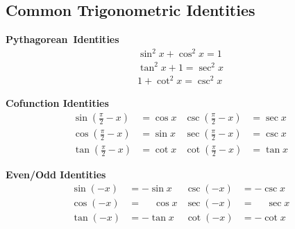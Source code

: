 \vfill

\subsection{Common Trigonometric Identities}

\noindent%
\begin{minipage}[t]{.25\linewidth}
	\textbf{Pythagorean~Identities}\vspace{-.5\baselineskip}
	\begin{gather*}
		\sin ^2x+\cos ^2x= 1 \\
		\tan^2x+ 1 = \sec^2 x \\
		1 + \cot^2x=\csc^2 x
	\end{gather*}
\end{minipage}%
\begin{minipage}[t]{.43\linewidth}
	\textbf{Cofunction Identities}\vspace{-.5\baselineskip}
	\begin{align*}
		\sin(\tfrac{\pi}{2}-x) &= \cos x &
		\csc(\tfrac{\pi}{2}-x) &= \sec x \\
		\cos(\tfrac{\pi}{2}-x) &= \sin x &
		\sec(\tfrac{\pi}{2}-x) &= \csc x \\
		\tan(\tfrac{\pi}{2}-x) &= \cot x &
		\cot(\tfrac{\pi}{2}-x) &= \tan x
	\end{align*}
\end{minipage}%
\begin{minipage}[t]{.32\linewidth}
\textbf{Even/Odd Identities}\vspace{-.5\baselineskip}
\begin{align*}
\sin(-x) &= -\sin x &
\csc(-x) &= -\csc x \\
\cos(-x) &= \phantom{-}\cos x &
\sec(-x) &= \phantom{-}\sec x \\
\tan(-x) &= -\tan x &
\cot(-x) &= -\cot x
\end{align*}
\end{minipage}

\vfill

